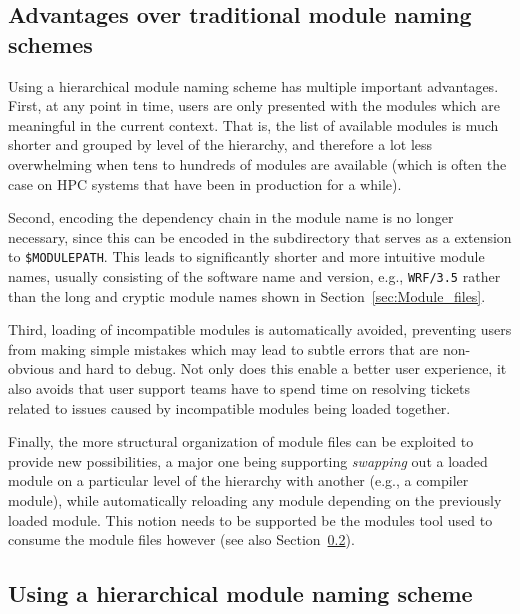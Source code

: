 \subsection{Advantages over traditional module naming schemes}
\label{sec:hierarchical_advantages}


Using a hierarchical module naming scheme has multiple important
advantages. First, at any point in time, users are only presented with the
modules which are meaningful in the current context. That is, the list of
available modules is much shorter and grouped by level of the hierarchy,
and therefore a lot less overwhelming when tens to hundreds of modules are
available (which is often the case on HPC systems that have been in
production for a while).

Second, encoding the dependency chain in the module name is no longer
necessary, since this can be encoded in the subdirectory that serves as a
extension to
\texttt{\$MODULEPATH}. This leads to significantly shorter and more intuitive
module names, usually consisting of the software name and version, e.g.,
\texttt{WRF/3.5} rather than the long and cryptic module names shown in
Section~\ref{sec:Module_files}.

Third, loading of incompatible
modules is automatically avoided, preventing users from making simple
mistakes which may lead to subtle errors that are non-obvious and hard to
debug. Not only does this enable a better user experience, it also avoids
that user support teams have to spend time on resolving tickets related
to issues caused by incompatible modules being loaded together.

Finally, the more structural organization of module files can be exploited
to provide new possibilities, a major one being supporting \emph{swapping}
out a loaded module on a particular level of the hierarchy with another
(e.g., a compiler module), while automatically reloading any module depending
on the previously loaded module. This notion needs to be supported be the
modules tool used to consume the module files however (see also
Section~\ref{sec:using_a_hierarchy}).


\subsection{Using a hierarchical module naming scheme}
\label{sec:using_a_hierarchy}

